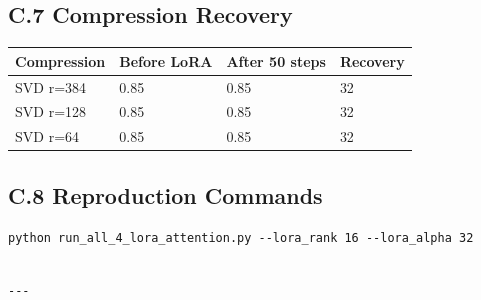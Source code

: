 \subsection{C.7 Compression Recovery}

\begin{table}[H]
\centering
\small
\begin{tabular}{llll}
\toprule
\textbf{Compression} & \textbf{Before LoRA} & \textbf{After 50 steps} & \textbf{Recovery} \\
\midrule
SVD r=384 & 0.85 & 0.85 & 32 \\
SVD r=128 & 0.85 & 0.85 & 32 \\
SVD r=64 & 0.85 & 0.85 & 32 \\
\bottomrule
\end{tabular}
\end{table}

\subsection{C.8 Reproduction Commands}

\begin{lstlisting}
python run_all_4_lora_attention.py --lora_rank 16 --lora_alpha 32
\end{lstlisting}
\begin{lstlisting}

---
\end{lstlisting}